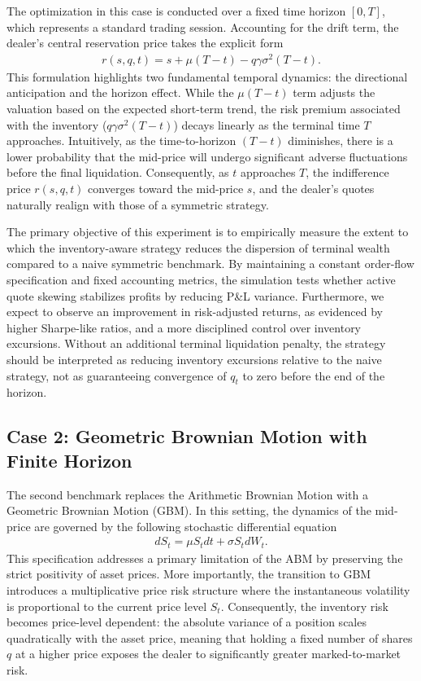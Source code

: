 The optimization in this case is conducted over a fixed time horizon $[0, T]$, which represents a standard trading session. Accounting for the drift term, the dealer's central reservation price takes the explicit form 
\begin{align*}
    r(s, q, t) = s + \mu(T-t) - q\gamma\sigma^2(T-t).
\end{align*}
This formulation highlights two fundamental temporal dynamics: the directional anticipation and the horizon effect. While the $\mu(T-t)$ term adjusts the valuation based on the expected short-term trend, the risk premium associated with the inventory ($q\gamma\sigma^2(T-t)$) decays linearly as the terminal time $T$ approaches. Intuitively, as the time-to-horizon $(T-t)$ diminishes, there is a lower probability that the mid-price will undergo significant adverse fluctuations before the final liquidation. Consequently, as $t$ approaches $T$, the indifference price $r(s, q, t)$ converges toward the mid-price $s$, and the dealer's quotes naturally realign with those of a symmetric strategy.

The primary objective of this experiment is to empirically measure the extent to which the inventory-aware strategy reduces the dispersion of terminal wealth compared to a naive symmetric benchmark. By maintaining a constant order-flow specification and fixed accounting metrics, the simulation tests whether active quote skewing stabilizes profits by reducing P\&L variance. Furthermore, we expect to observe an improvement in risk-adjusted returns, as evidenced by higher Sharpe-like ratios, and a more disciplined control over inventory excursions. Without an additional terminal liquidation penalty, the strategy should be interpreted as reducing inventory excursions relative to the naive strategy, not as guaranteeing convergence of $q_t$ to zero before the end of the horizon.

\subsection{Case 2: Geometric Brownian Motion with Finite Horizon}\label{sec:gbm}

The second benchmark replaces the Arithmetic Brownian Motion with a Geometric Brownian Motion (GBM). In this setting, the dynamics of the mid-price are governed by the following stochastic differential equation
\begin{align*}
    dS_t = \mu S_t dt + \sigma S_t dW_t.
\end{align*}
This specification addresses a primary limitation of the ABM by preserving the strict positivity of asset prices. More importantly, the transition to GBM introduces a multiplicative price risk structure where the instantaneous volatility is proportional to the current price level $S_t$. Consequently, the inventory risk becomes price-level dependent: the absolute variance of a position scales quadratically with the asset price, meaning that holding a fixed number of shares $q$ at a higher price exposes the dealer to significantly greater marked-to-market risk.

